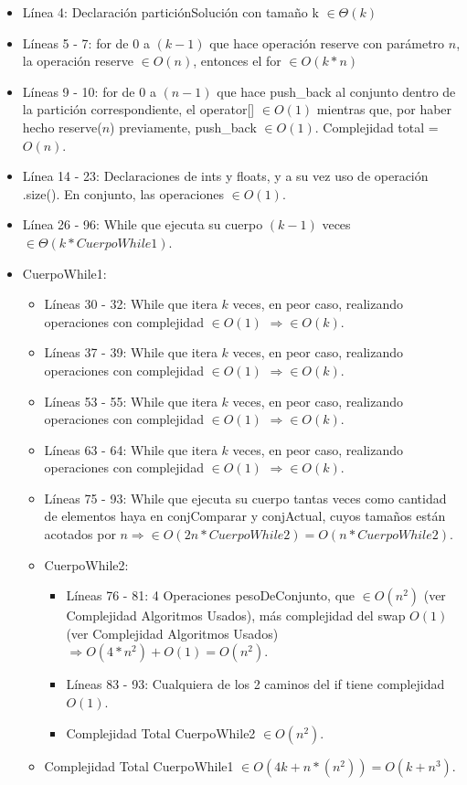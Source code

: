 \documentclass[10pt,a4paper]{article}
\begin{document}
\begin{itemize}
\item Línea 4: Declaración particiónSolución con tamaño k $\in \Theta(k)$
\item Líneas 5 - 7: for de $0$ a $(k-1)$ que hace operación reserve con parámetro $n$, la operación reserve $\in O(n)$, entonces el for $\in O(k*n)$
\item Líneas 9 - 10: for de $0$ a $(n-1)$ que hace push\_back al conjunto dentro de la partición correspondiente, el operator[] $\in O(1)$ mientras que, por haber hecho reserve($n$) previamente, push\_back $\in O(1)$. Complejidad total = $O(n)$.
\item Línea 14 - 23: Declaraciones de ints y floats, y a su vez uso de operación .size(). En conjunto, las operaciones $\in O(1)$.
\item Línea 26 - 96: While que ejecuta su cuerpo $(k-1)$ veces $\in \Theta(k*CuerpoWhile1)$.
\item CuerpoWhile1:
\begin{itemize}
\item Líneas 30 - 32: While que itera $k$ veces, en peor caso, realizando operaciones con complejidad $\in O(1)$ $\Rightarrow \in O(k)$.
\item Líneas 37 - 39: While que itera $k$ veces, en peor caso, realizando operaciones con complejidad $\in O(1)$ $\Rightarrow \in O(k)$.
\item Líneas 53 - 55: While que itera $k$ veces, en peor caso, realizando operaciones con complejidad $\in O(1)$ $\Rightarrow \in O(k)$.
\item Líneas 63 - 64: While que itera $k$ veces, en peor caso, realizando operaciones con complejidad $\in O(1)$ $\Rightarrow \in O(k)$.
\item Líneas 75 - 93: While que ejecuta su cuerpo tantas veces como cantidad de elementos haya en conjComparar y conjActual, cuyos tamaños están acotados por $n \Rightarrow \in O(2n*CuerpoWhile2) = O(n*CuerpoWhile2)$.
\item CuerpoWhile2:
\begin{itemize}
\item Líneas 76 - 81: 4 Operaciones pesoDeConjunto, que $\in O(n^2)$ (ver Complejidad Algoritmos Usados), más complejidad del swap $O(1)$ (ver Complejidad Algoritmos Usados) $\Rightarrow O(4*n^2) + O(1) = O(n^2)$.
\item Líneas 83 - 93: Cualquiera de los 2 caminos del if tiene complejidad $O(1)$.
\item Complejidad Total CuerpoWhile2 $\in O(n^2)$.
\end{itemize}
\item Complejidad Total CuerpoWhile1 $\in O(4k + n*(n^2)) = O(k + n^3)$.
\end{itemize}
\end{itemize}
\end{document}
